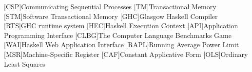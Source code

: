 \begin{acronym}[ACRONYM]
[CSP]{Communicating Sequential Processes}
[TM]{Transactional Memory}
[STM]{Software Transactional Memory}
[GHC]{Glasgow Haskell Compiler}
[RTS]{GHC runtime system}
[HEC]{Haskell Execution Context}
[API]{Application Programming Interface}
[CLBG]{The Computer Language Benchmarks Game}
[WAI]{Haskell Web Application Interface}
[RAPL]{Running Average Power Limit}
[MSR]{Machine-Specific Register}
[CAF]{Constant Applicative Form}
[OLS]{Ordinary Least Squares}
\end{acronym}
